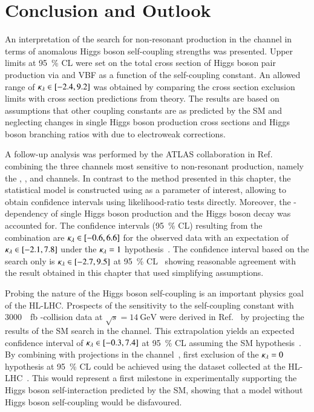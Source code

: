\section{Conclusion and Outlook}%
\label{sec:reinterpretation_conclusion}

An interpretation of the search for non-resonant \HH production in the
\bbtautau channel in terms of anomalous Higgs boson self-coupling
strengths was presented. Upper limits at \SI{95}{\percent} CL were set
on the total cross section of Higgs boson pair production via \ggF and
VBF as a function of the self-coupling constant. An allowed range of
$\kappa_{\lambda} \in [-2.4, 9.2]$ was obtained by comparing the cross section
exclusion limits with cross section predictions from theory. The
results are based on assumptions that other coupling constants are as
predicted by the SM and neglecting changes in single Higgs boson
production cross sections and Higgs boson branching ratios with
\klambda due to electroweak corrections.

A follow-up analysis was performed by the ATLAS collaboration in
Ref.~\cite{ATL-HDBS-2022-03-002} combining the three channels most
sensitive to non-resonant \HH production, namely the \bbtautau, \bbbb,
and \bbyy channels. In contrast to the method presented in this
chapter, the statistical model is constructed using \klambda as a
parameter of interest, allowing to obtain confidence intervals using
likelihood-ratio tests directly. Moreover, the \klambda-dependency of
single Higgs boson production and the Higgs boson decay was accounted
for. The confidence intervals (\SI{95}{\percent} CL) resulting from
the combination are $\kappa_{\lambda} \in [-0.6, 6.6]$ for the observed data
with an expectation of $\kappa_{\lambda} \in [-2.1, 7.8]$ under the
$\kappa_{\lambda} = 1$ hypothesis~\cite{ATL-HDBS-2022-03-002}. The \klambda
confidence interval based on the \bbtautau search only is
$\kappa_{\lambda} \in [-2.7, 9.5]$ at \SI{95}{\percent}
CL~\cite{ATL-HDBS-2022-03-002} showing reasonable agreement with the
result obtained in this chapter that used simplifying assumptions.

Probing the nature of the Higgs boson self-coupling is an important
physics goal of the HL-LHC. Prospects of the sensitivity to the
self-coupling constant with \SI{3000}{\per\femto\barn} \pp-collision
data at $\sqrt{s} = \SI{14}{\GeV}$ were derived in
Ref.~\cite{ATL-PHYS-PUB-2021-044} by projecting the results of the SM
\HH search in the \bbtautau channel. This extrapolation yields an
expected confidence interval of $\kappa_{\lambda} \in [-0.3, 7.4]$ at
\SI{95}{\percent} CL assuming the SM
hypothesis~\cite{ATL-PHYS-PUB-2021-044}. By combining with projections
in the \bbyy channel~\cite{ATL-PHYS-PUB-2022-001}, first exclusion of
the $\kappa_{\lambda} = 0$ hypothesis at \SI{95}{\percent} CL could be
achieved using the dataset collected at the
HL-LHC~\cite{ATL-PHYS-PUB-2022-005}. This would represent a first
milestone in experimentally supporting the Higgs boson
self-interaction predicted by the SM, showing that a model without
Higgs boson self-coupling would be disfavoured.

